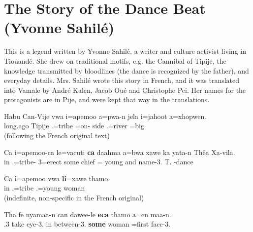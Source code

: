 \chapter{The Story of the Dance Beat (Yvonne Sahilé)}

This is a legend written by Yvonne Sahilé, a writer and culture activist living in Tiouandé. She drew on traditional motifs, e.g. the Cannibal of Tipije, the knowledge transmitted by bloodlines (the dance is recognized by the father), and everyday details. Mrs. Sahilé wrote this story in French, and it was translated into Vamale by André Kalen, Jacob Oué and Christophe Pei. Her names for the protagonists are in Pije, and were kept that way in the translations.

\label{text:beat}
\ea %

\gll 	Habu Can-Vije vwa i=apemoo a=pwa-n jela i=jahoot a=xhopwen.	\\	long.ago Tipije  .=tribe =on- side .=river =big	\\ \glt  {} (following the French original text)		


\z \ea %
\gll 	Ca i=apemoo-ca le=vacuti \textbf{ca} daahma a=bwa xawe ka yata-n Thêa Xa-vila.	\\	in .=tribe- 3=erect some chief = young and name-3. T. -dance	\\ 
\glt  {}		
\z 

\ea %
\gll Ca \textbf{i}=apemoo vwa \textbf{li}=xawe thamo.
\\ in .=tribe  .=young woman	
\\ \glt {} (indefinite, non-specific in the French original)
\z 

\ea %
\gll Tha fe nyamaa-n can dawee-le \textbf{eca} thamo a=en maa-n.\\ 
     .3 take eye-3. in between-3. \textbf{some} woman =first face-3.\\ 
\glt {}
\z


